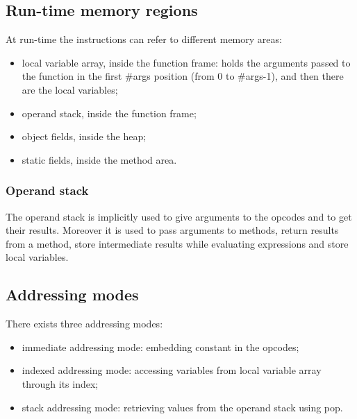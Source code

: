\subsection{Run-time memory regions}
At run-time the instructions can refer to different memory areas:
\begin{itemize}
    \item local variable array, inside the function frame: holds the arguments passed to the function in the first \#args position (from 0 to \#args-1), and then there are the local variables;
    \item operand stack, inside the function frame;
    \item object fields, inside the heap;
    \item static fields, inside the method area.
\end{itemize}

\subsubsection{Operand stack}
The operand stack is implicitly used to give arguments to the opcodes and to get their results.
Moreover it is used to pass arguments to methods, return results from a method, store intermediate results while evaluating expressions and store local variables.

\subsection{Addressing modes}
There exists three addressing modes:
\begin{itemize}
    \item immediate addressing mode: embedding constant in the opcodes;
    \item indexed addressing mode: accessing variables from local variable array through its index;
    \item stack addressing mode: retrieving values from the operand stack using pop.
\end{itemize}

